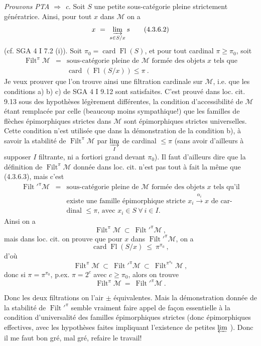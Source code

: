\documentclass[11pt]{article}
\newcommand{\msp}[1]{\marginpar{\footnotesize [#1]}}
\newcommand{\card}{\operatorname{card}}
\newcommand{\Fl}{\operatorname{Fl}}
\newcommand{\Filt}{\operatorname{Filt}}
\begin{document}
\noindent\textit{Prouvons PTA $\Longrightarrow$ c.} Soit $S$ une petite sous-catégorie pleine strictement génératrice. Ainsi, \msp{page 72}pour tout $x$ dans $\mathcal M$ on a
\[
x\ =\ \varinjlim_{s\in S/x}s
\tag*{(4.3.6.2)}
\]
(cf. SGA 4 I 7.2 (i)). Soit $\pi_0=\card\Fl(S)$, et pour tout cardinal $\pi\geqslant\pi_0$, soit
\[
\begin{array}{lcl}
\Filt^\pi\mathcal M & = & \text{sous-catégorie pleine de $\mathcal M$ formée des objets $x$ tels que}\\
 & & \card\,(\Fl(S/x))\leqslant\pi\ .
\end{array}
\tag*{(4.3.6.3)}
\]
Je veux prouver que l'on trouve ainsi une filtration cardinale sur $\mathcal M$, i.e. que les conditions a) b) c) de SGA 4 I 9.12 sont satisfaites. C'est prouvé dans loc. cit. 9.13 sous des hypothèses légèrement différentes, la condition d'accessibilité de $\mathcal M$ étant remplacée par celle (beaucoup moins sympathique!) que les familles de flèches épimorphiques strictes dans $\mathcal M$ sont épimorphiques strictes universelles. Cette condition n'est utilisée que dans la démonstration de la condition b), à savoir la stabilité de $\Filt^\pi\mathcal M$ par $\varinjlim\limits_I$ de cardinal $\leqslant\pi$ (sans avoir d'ailleurs à supposer $I$ filtrante, ni a fortiori grand devant $\pi_0$). Il faut d'ailleurs dire que la définition de $\Filt^\pi\mathcal M$ donnée dans loc. cit. n'est pas tout à fait la même que (4.3.6.3), \msp{page 73}mais c'est
\[
\begin{array}{lcl}
\Filt'^{\pi}\mathcal M & = & \text{sous-catégorie pleine de $\mathcal M$ formée des objets $x$ tels qu'il}\\
 & & \text{existe une famille épimorphique stricte $x_i\xrightarrow{\alpha_i}x$ de car-}\\
 & & \text{dinal $\leqslant\pi$, avec $x_i\in S\ \forall\ i\in I$.}
\end{array}
\tag*{(4.3.6.3$'$)}
\]
Ainsi on a
\[
\Filt^\pi\mathcal M\ \subset\ \Filt'^{\pi}\mathcal M\ ,
\]
mais dans loc. cit. on prouve que pour $x$ dans $\Filt'^{\pi}\mathcal M$, on a
\[
\card\Fl(S/x)\ \leqslant\ \pi^{\pi_0}\ ,
\]
d'où
\[
\Filt^\pi\mathcal M\ \subset\ \Filt'^{\pi}\mathcal M\ \subset\ \Filt^{\pi^{\pi_0}}\mathcal M\ ,
\]
donc si $\pi=\pi^{\pi_0}$, p.ex. $\pi=2^c$ avec $c\geqslant\pi_0$, alors on trouve
\[
\Filt^\pi\mathcal M\ =\ \Filt'^{\pi}\mathcal M\ .
\]

\noindent Donc les deux filtrations on l'air $\pm$ équivalentes. Mais la démonstration donnée de la stabilité de $\Filt'^{\pi}$ semble vraiment faire appel de façon essentielle à la condition d'universalité des familles épimorphiques strictes (donc épimorphiques effectives, avec les hypothèses faites impliquant l'existence de petites $\varprojlim$ ). Donc il me faut bon gré, mal gré, refaire le travail! %
\end{document}
